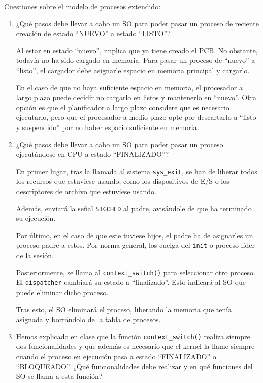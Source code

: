 \begin{ejercicio}
    Cuestiones sobre el modelo de procesos extendido:
    \begin{enumerate}
        \item ¿Qué pasos debe llevar a cabo un SO para poder pasar un proceso de reciente creación de estado ``NUEVO'' a estado ``LISTO''?

        Al estar en estado ``nuevo'', implica que ya tiene creado el PCB. No obstante, todavía no ha sido cargado en memoria. Para pasar un proceso de ``nuevo'' a ``listo'', el cargador debe asignarle espacio en memoria principal y cargarlo.

        En el caso de que no haya suficiente espacio en memoria, el procesador a largo plazo puede decidir no cargarlo en listos y mantenerlo en ``nuevo''. Otra opción es que el planificador a largo plazo considere que es necesario ejecutarlo, pero que el procesador a medio plazo opte por descartarlo a ``listo y suspendido'' por no haber espacio suficiente en memoria.

        
        \item ¿Qué pasos debe llevar a cabo un SO para poder pasar un proceso ejecutándose en CPU a estado ``FINALIZADO''?

        En primer lugar, tras la llamada al sistema \verb|sys_exit|, se han de liberar todos los recursos que estuviese usando, como los dispositivos de E/S o los descriptores de archivo que estuviese usando.

        Además, enviará la señal \verb|SIGCHLD| al padre, avisándole de que ha terminado su ejecución.

        Por último, en el caso de que este tuviese hijos, el padre ha de asignarles un proceso padre a estos. Por norma general, los cuelga del \verb|init| o proceso líder de la sesión.

        Posteriormente, se llama al \verb|context_switch()| para seleccionar otro proceso. El \verb|dispatcher| cambiará su estado a ``finalizado''. Esto indicará al SO que puede eliminar dicho proceso.

        Tras esto, el SO eliminará el proceso, liberando la memoria que tenía asignada y borrándolo de la tabla de procesos.

        \item Hemos explicado en clase que la función \verb|context_switch()| realiza siempre dos funcionalidades y que además es necesario que el kernel la llame siempre cuando el proceso en ejecución pasa a estado ``FINALIZADO'' o ``BLOQUEADO''. ¿Qué funcionalidades debe realizar y en qué funciones del SO se llama a esta función?


\end{enumerate}
\end{ejercicio}
